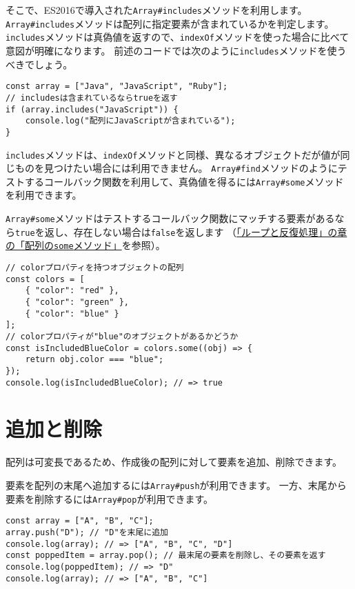 そこで、ES2016で導入された\texttt{Array\#includes}メソッド\protect{}を利用します。
\texttt{Array\#includes}メソッドは配列に指定要素が含まれているかを判定します。
\texttt{includes}メソッドは真偽値を返すので、\texttt{indexOf}メソッドを使った場合に比べて意図が明確になります。
前述のコードでは次のように\texttt{includes}メソッドを使うべきでしょう。

\begin{lstlisting}
const array = ["Java", "JavaScript", "Ruby"];
// includesは含まれているならtrueを返す
if (array.includes("JavaScript")) {
    console.log("配列にJavaScriptが含まれている");
}
\end{lstlisting}

\texttt{includes}メソッドは、\texttt{indexOf}メソッドと同様、異なるオブジェクトだが値が同じものを見つけたい場合には利用できません。
\texttt{Array\#find}メソッドのようにテストするコールバック関数を利用して、真偽値を得るには\texttt{Array\#some}メソッドを利用できます。

\texttt{Array\#some}メソッドはテストするコールバック関数にマッチする要素があるなら\texttt{true}を返し、存在しない場合は\texttt{false}を返します
（\hyperlink{array-some}{「ループと反復処理」の章の「配列の\texttt{some}メソッド」}を参照）。

\begin{lstlisting}
// colorプロパティを持つオブジェクトの配列
const colors = [
    { "color": "red" },
    { "color": "green" },
    { "color": "blue" }
];
// colorプロパティが"blue"のオブジェクトがあるかどうか
const isIncludedBlueColor = colors.some((obj) => {
    return obj.color === "blue";
});
console.log(isIncludedBlueColor); // => true
\end{lstlisting}

\hypertarget{add-and-delete}{%
\section{追加と削除}\label{add-and-delete}}

配列は可変長であるため、作成後の配列に対して要素を追加、削除できます。

要素を配列の末尾へ追加するには\texttt{Array\#push}が利用できます。
一方、末尾から要素を削除するには\texttt{Array\#pop}が利用できます。

\begin{lstlisting}
const array = ["A", "B", "C"];
array.push("D"); // "D"を末尾に追加
console.log(array); // => ["A", "B", "C", "D"]
const poppedItem = array.pop(); // 最末尾の要素を削除し、その要素を返す 
console.log(poppedItem); // => "D"
console.log(array); // => ["A", "B", "C"]
\end{lstlisting}

